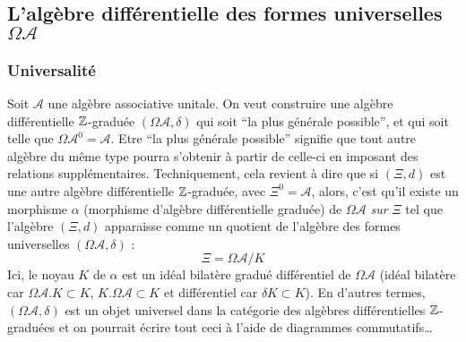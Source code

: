 \subsection{L'alg\`ebre diff\'erentielle des formes universelles  $\Omega{\mathcal A}$}


	\subsubsection{Universalit\'e}  Soit $\mathcal A$ une alg\`ebre associative unitale. 
	On veut construire une alg\`ebre diff\'erentielle $\mathbb{Z}$-gradu\'ee $(\Omega{\mathcal 
	A},\delta)$ qui soit ``la plus g\'en\'erale possible'', et qui soit telle 
	que $\Omega{\mathcal A}^{0} = {\mathcal A}$. Etre ``la plus g\'en\'erale 
	possible'' signifie que tout autre alg\`ebre du m\^eme type pourra 
	s'obtenir \`a partir de celle-ci en imposant des relations 
	suppl\'ementaires. Techniquement, 
	cela revient \`a dire que si $(\Xi, d)$ est une autre alg\`ebre 
	diff\'erentielle $\mathbb{Z}$-gradu\'ee, avec $\Xi^{0} = {\mathcal A}$, alors, 
	c'est qu'il existe un morphisme $\alpha$ (morphisme d'alg\`ebre diff\'erentielle 
	gradu\'ee) de $\Omega{\mathcal A}$ {\sl sur\/} $\Xi$ tel que
    l'alg\`ebre $(\Xi, d)$ apparaisse comme un quotient de l'alg\`ebre 
    des formes universelles
	$(\Omega{\mathcal A},\delta)$ : $$\Xi = \Omega{\mathcal A} / K$$ 
	Ici, le noyau
	$K$ de $\alpha$ est un id\'eal bilat\`ere gradu\'e diff\'erentiel de $\Omega{\mathcal 
	A}$ (id\'eal bilat\`ere car $\Omega{\mathcal A}.K \subset K$, $K.\Omega{\mathcal 
	A} \subset K$ et diff\'erentiel car $\delta K \subset K$).
	En d'autres termes, $(\Omega{\mathcal A},\delta)$  est un objet 
	universel dans la cat\'egorie des alg\`ebres diff\'erentielles 
	$\mathbb{Z}$-gradu\'ees et on pourrait \'ecrire tout ceci \`a l'aide de 
	diagrammes commutatifs\ldots
	

